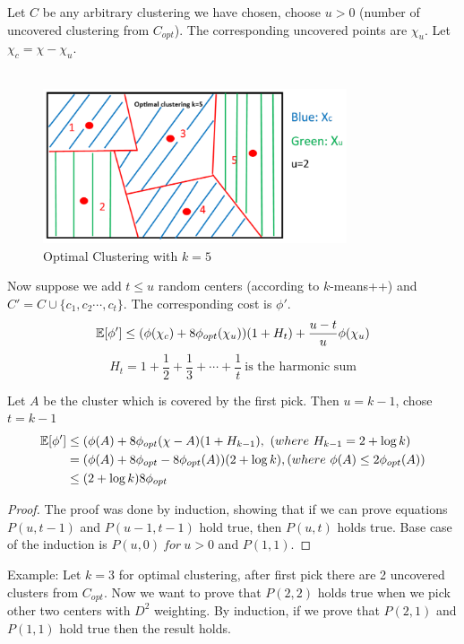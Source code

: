 \begin{lemma}
  Let $C$ be any arbitrary clustering we have chosen, choose $u>0$
  (number of uncovered clustering from $C_{opt}$). The corresponding
  uncovered points are $\chi_u$. Let $\chi_c=\chi-\chi_u$.\\\\ 
  \begin{figure}[H]
    \centering
    \includegraphics[width=0.8\textwidth]{chapter_1/files/pick_from_uncovered_points.png}
    \caption{\small Optimal Clustering with $k=5$}
  \end{figure}
  Now suppose we add $t\leq u$ random centers (according to
  $k$-means++) and $C'=C\cup\{c_1,c_2\cdots, c_t\}$. The corresponding
  cost is $\phi'$.\\ 
  $$\mathbb{E}[\phi']\leq(\phi(\chi_c)+8\phi_{opt}(\chi_u))(1+H_t)+\frac{u-t}{u}\phi(\chi_u)$$ 
  $$H_t=1+\frac{1}{2}+\frac{1}{3}+\cdots+\frac{1}{t}\ \text{is the harmonic sum}$$
\end{lemma} 

Let $A$ be the cluster which is covered by the first pick. Then
$u=k-1$, chose $t=k-1$ 
\begin{align*}
  \E[\phi']&\leq(\phi(A)+8\phi_{opt}(\chi-A)(1+H_{k-1}),\ (where\ H_{k-1}=2+\log
  k)\\ 
  &= (\phi(A)+8\phi_{opt}-8\phi_{opt}(A))(2+\log k),
  (where\ \phi(A)\leq2\phi_{opt}(A))\\  
  &\leq(2+\log k)8\phi_{opt}		
\end{align*}

\begin{proof}
  The proof was done by induction, showing that if we can prove
  equations $P(u,t-1)$ and $P(u-1,t-1)$ hold true, then $P(u,t)$ holds
  true. Base case of the induction is $P(u,0)\ for\ u>0$ and
  $P(1,1)$. 
\end{proof}

Example: Let $k=3$ for optimal clustering, after first pick there are
2 uncovered clusters from $C_{opt}$. Now we want to prove that
$P(2,2)$ holds true when we pick other two centers with $D^2$
weighting. By induction, if we prove that $P(2,1)$ and $P(1,1)$ hold
true then the result holds.  

